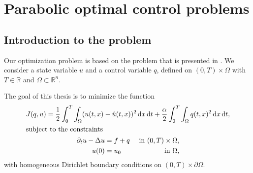 \chapter{Parabolic optimal control problems}

\section{Introduction to the problem}
Our optimization problem is based on the problem that is presented in \cite{doi:10.1137/070694016}. We consider a state variable $u$ and a control variable $q$, defined on $(0,T)\times\Omega$ with $T\in\mathbb{R}$ and $\Omega\subset\mathbb{R}^n$.

The goal of this thesis is to minimize the function
\begin{subequations}
\label{conProb}
\begin{gather}
J(q,u)=\frac{1}{2}\int_0^T\int_\Omega(u(t,x)-\hat{u}(t,x))^2\,\mathrm{d}x\,\mathrm{d}t+\frac{\alpha}{2}\int_0^T\int_\Omega q(t,x)^2\,\mathrm{d}x\,\mathrm{d}t\label{objFun},\\
\intertext{subject to the constraints}
\begin{aligned}
	\partial_tu-\Delta u&=f+q&\text{ in }(0,T)\times\Omega,\\
	u(0)&=u_0&\text{ in }\Omega,
\end{aligned}
\label{constraints}
\end{gather}
\end{subequations}
with homogeneous Dirichlet boundary conditions on $(0,T)\times\partial\Omega$.

